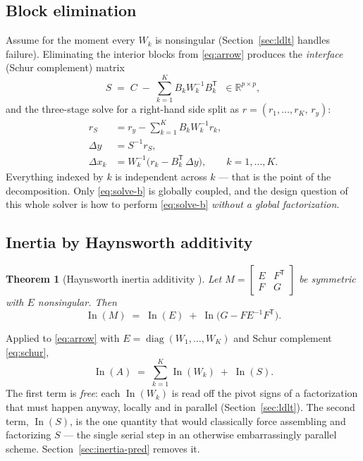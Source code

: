 \documentclass[11pt]{article}
\newtheorem{theorem}{Theorem}
\newcommand{\In}{\operatorname{In}}
\newcommand{\diag}{\operatorname{diag}}
\newcommand{\R}{\mathbb{R}}
\begin{document}
\subsection{Block elimination}

Assume for the moment every $W_k$ is nonsingular (Section~\ref{sec:ldlt}
handles failure).  Eliminating the interior blocks from \eqref{eq:arrow}
produces the \emph{interface} (Schur complement) matrix
\begin{equation}
  S \;=\; C \;-\; \sum_{k=1}^{K} B_k W_k^{-1} B_k^{\mathsf T}
  \;\;\in\R^{p\times p},
  \label{eq:schur}
\end{equation}
and the three-stage solve for a right-hand side split as
$r = (r_1,\dots,r_K,\,r_y)$:
\begin{align}
  r_S &= r_y - \sum_{k=1}^{K} B_k W_k^{-1} r_k ,
  \label{eq:solve-a}\\
  \Delta y &= S^{-1} r_S ,
  \label{eq:solve-b}\\
  \Delta x_k &= W_k^{-1}\bigl(r_k - B_k^{\mathsf T}\,\Delta y\bigr),
  \qquad k = 1,\dots,K.
  \label{eq:solve-c}
\end{align}
Everything indexed by $k$ is independent across $k$ --- that is the point of
the decomposition.  Only \eqref{eq:solve-b} is globally coupled, and the
design question of this whole solver is how to perform
\eqref{eq:solve-b} \emph{without a global factorization}.

\subsection{Inertia by Haynsworth additivity}
\label{sec:haynsworth}

\begin{theorem}[Haynsworth inertia additivity \cite{haynsworth1968}]
\label{thm:haynsworth}
Let
$M = \begin{bmatrix} E & F^{\mathsf T}\\ F & G\end{bmatrix}$
be symmetric with $E$ nonsingular.  Then
\[
  \In(M) \;=\; \In(E) \;+\; \In\!\bigl(G - F E^{-1} F^{\mathsf T}\bigr).
\]
\end{theorem}

Applied to \eqref{eq:arrow} with
$E = \diag(W_1,\dots,W_K)$ and Schur complement \eqref{eq:schur},
\begin{equation}
  \In(A) \;=\; \sum_{k=1}^{K} \In(W_k) \;+\; \In(S).
  \label{eq:haynsworth}
\end{equation}
The first term is \emph{free}: each $\In(W_k)$ is read off the pivot signs of
a factorization that must happen anyway, locally and in parallel
(Section~\ref{sec:ldlt}).  The second term, $\In(S)$, is the one quantity
that would classically force assembling and factorizing $S$ --- the single
serial step in an otherwise embarrassingly parallel scheme.
Section~\ref{sec:inertia-pred} removes it.
\end{document}
